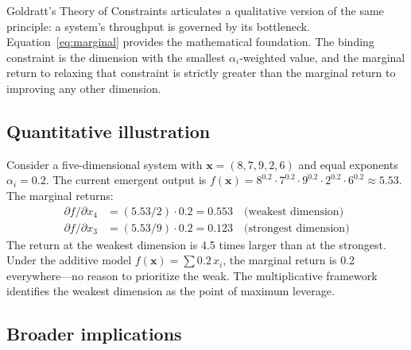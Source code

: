 \documentclass[12pt, a4paper]{article}
\theoremstyle{definition}
\theoremstyle{remark}
\begin{document}
Goldratt's Theory of Constraints \cite{goldratt1984} articulates a qualitative version of the same principle: a system's throughput is governed by its bottleneck. Equation~\eqref{eq:marginal} provides the mathematical foundation. The binding constraint is the dimension with the smallest $\alpha_i$-weighted value, and the marginal return to relaxing that constraint is strictly greater than the marginal return to improving any other dimension.

\subsection{Quantitative illustration}

Consider a five-dimensional system with $\mathbf{x} = (8, 7, 9, 2, 6)$ and equal exponents $\alpha_i = 0.2$. The current emergent output is $f(\mathbf{x}) = 8^{0.2} \cdot 7^{0.2} \cdot 9^{0.2} \cdot 2^{0.2} \cdot 6^{0.2} \approx 5.53$. The marginal returns:
\begin{align*}
\partial f / \partial x_4 &= (5.53 / 2) \cdot 0.2 = 0.553 \quad \text{(weakest dimension)} \\
\partial f / \partial x_3 &= (5.53 / 9) \cdot 0.2 = 0.123 \quad \text{(strongest dimension)}
\end{align*}
The return at the weakest dimension is 4.5 times larger than at the strongest. Under the additive model $f(\mathbf{x}) = \sum 0.2 \, x_i$, the marginal return is 0.2 everywhere---no reason to prioritize the weak. The multiplicative framework identifies the weakest dimension as the point of maximum leverage.

\subsection{Broader implications}
\end{document}
